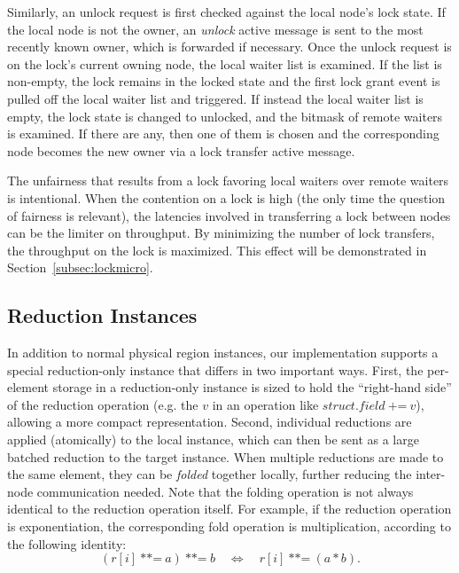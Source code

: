Similarly, an unlock request is first checked against the local node's lock state.  If the local node is
not the owner, an {\em unlock} active message is sent to the most recently known owner, which is forwarded
if necessary.  Once the unlock request is on the lock's current owning node, the local waiter list is
examined.  If the list is non-empty, the lock remains in the locked state and the first lock grant
event is pulled off the local waiter list and triggered.  If instead the local waiter list is empty, the
lock state is changed to unlocked, and the bitmask of remote waiters is examined.  If there are any, then
one of them is chosen and the corresponding node becomes the new owner via a lock transfer active message.

The unfairness that results from a lock favoring local waiters over remote waiters is intentional.  When the
contention on a lock is high (the only time the question of fairness is relevant), the latencies
involved in transferring a lock between nodes can be the limiter on throughput.  By minimizing the number
of lock transfers, the throughput on the lock is maximized.  This effect will be demonstrated in
Section~\ref{subsec:lockmicro}.


\subsection{Reduction Instances}
\label{subsec:reducimpl}

In addition to normal physical region instances, our implementation supports a special reduction-only
instance that differs in two important ways.  First, the per-element storage in a reduction-only instance
is sized to hold the ``right-hand side'' of the reduction operation (e.g. the $v$ in an operation like
$struct.field\ \text{+=}\ v$), allowing a more compact representation.  Second, individual reductions are applied
(atomically) to the local instance, which can then be sent as a large batched reduction to the target
instance.  When multiple reductions are made to the same element, they can be {\em folded} together locally,
further reducing the inter-node communication needed.  Note that the folding operation is not always
identical to the reduction operation itself.  For example, if the reduction operation is exponentiation,
the corresponding fold operation is multiplication, according to the following identity:
$$(r[i]\ \text{**=}\ a)\ \text{**=}\ b \quad \Leftrightarrow \quad r[i]\ \text{**=}\ (a * b).$$

